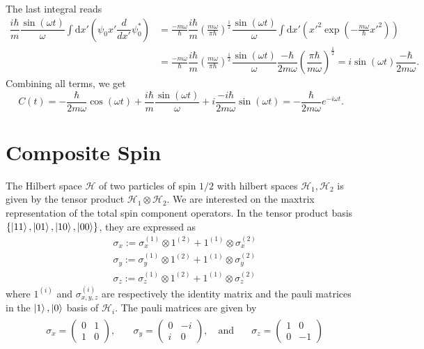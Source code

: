 \documentclass[10pt, a4paper]{article}
\begin{document}
The last integral reads 
\begin{align*}
    \dfrac{i \hbar}{m} \dfrac{\sin(\omega t)}{\omega} \int \text{d}x'  \left( \psi_0 x' \dfrac{d}{dx'} \psi_0^*  \right) &= \frac{-m \omega}{\hbar}\dfrac{i \hbar}{m} \left(\frac{m \omega}{\pi \hbar}\right)^{\frac{1}{2}}  \dfrac{\sin(\omega t)}{\omega} \int \text{d}x'  \left(x'^2  \exp \left(-\frac{m \omega}{\hbar} x'^2\right)\right) \\
    &= \frac{-m \omega}{\hbar}\dfrac{i \hbar}{m} \left(\frac{m \omega}{\pi \hbar}\right)^{\frac{1}{2}}  \dfrac{\sin(\omega t)}{\omega} \dfrac{-\hbar}{2 m\omega}\left(\dfrac{\pi \hbar}{m \omega}\right)^{\frac12} = i \sin(\omega t) \dfrac{-\hbar}{2 m\omega}. 
\end{align*}
Combining all terms, we get 
$$
C(t) = -\dfrac{\hbar}{2 m\omega}\cos(\omega t) +   \dfrac{i \hbar}{m} \dfrac{\sin(\omega t)}{\omega} + i \dfrac{-i\hbar}{2 m\omega} \sin(\omega t)  = - \dfrac{\hbar}{2 m\omega} e^{-i \omega t}.
$$


\section{Composite Spin}
The Hilbert space $\mathcal{H}$ of two particles of spin $1/2$ with hilbert spaces $\mathcal{H}_1, \mathcal{H}_2$ is given by the tensor product $\mathcal{H}_1 \otimes \mathcal{H}_2$. We are interested on the maxtrix representation of the total spin component operators. In the tensor product basis $\{\ket{11}, \ket{01}, \ket{10}, \ket{00}\}$, they are expressed as  
\begin{align*}
    &\sigma_x := \sigma_x^{(1)} \otimes 1^{(2)} + 1^{(1)} \otimes \sigma_x^{(2)}\\
    &\sigma_y := \sigma_y^{(1)} \otimes 1^{(2)} + 1^{(1)} \otimes \sigma_y^{(2)}\\
    &\sigma_z := \sigma_z^{(1)} \otimes 1^{(2)} + 1^{(1)} \otimes \sigma_z^{(2)}
\end{align*}
where $1^{(i)}$ and $\sigma_{x, y, z}^{(i)}$ are respectively  the identity matrix and the pauli matrices in the ${\ket{1}, \ket{0}}$ basis of $\mathcal{H}_i$. The pauli matrices are given by 
\begin{align*}
    \begin{aligned}
        & \sigma_{x}=\begin{pmatrix}
        0 & 1 \\
        1 & 0
        \end{pmatrix}, \quad 
        & \sigma_{y}=
        \begin{pmatrix}
        0 & -i \\
        i & 0
        \end{pmatrix}, \quad \text{and} \quad 
        & \sigma_{z}=\begin{pmatrix}
        1 & 0 \\
        0 & -1
        \end{pmatrix}
        \end{aligned}
\end{align*}
\end{document}
